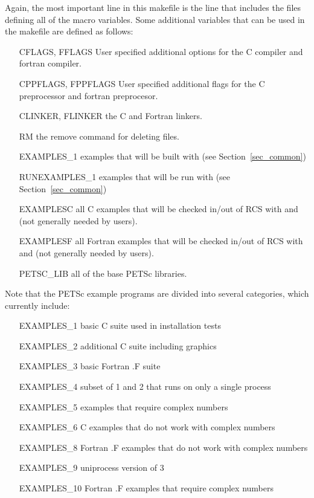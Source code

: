 {{{Again, the most important line in this makefile is the 
line that includes the files defining all of the macro variables.
Some additional variables that can be used in the makefile are defined
as follows:
\begin{itemize}
\item[CFLAGS, FFLAGS] User specified additional options for the C compiler and
        fortran compiler.
\item[CPPFLAGS, FPPFLAGS] User specified additional flags for the C preprocessor
        and fortran preprocesor.
\item[CLINKER, FLINKER] the C and Fortran linkers. 
\item[RM] the remove command for deleting files.
\item[EXAMPLES\_1] examples that will be built with
              (see Section~\ref{sec_common})
\item[RUNEXAMPLES\_1] examples that will be run with
               (see Section~\ref{sec_common})
\item[EXAMPLESC] all C examples that will be checked in/out of RCS
             with   and   (not generally
             needed by users).
\item[EXAMPLESF] all Fortran examples that will be checked in/out of
             RCS with   and   (not generally
             needed by users).
\item[PETSC\_LIB] all of the base PETSc libraries.
\end{itemize}
Note that the PETSc example programs are divided into several
categories, which currently include: 
\begin{itemize}
\item[EXAMPLES\_1] basic C suite used in installation tests\\
\item[EXAMPLES\_2] additional C suite including graphics\\
\item[EXAMPLES\_3] basic Fortran .F suite\\
\item[EXAMPLES\_4] subset of 1 and 2 that runs on only a single process\\
\item[EXAMPLES\_5] examples that require complex numbers\\
\item[EXAMPLES\_6] C examples that do not work with complex numbers\\
\item[EXAMPLES\_8] Fortran .F examples that do not work with complex numbers\\
\item[EXAMPLES\_9] uniprocess version of 3\\
\item[EXAMPLES\_10] Fortran .F examples that require complex numbers\\
\end{itemize}

}}}
